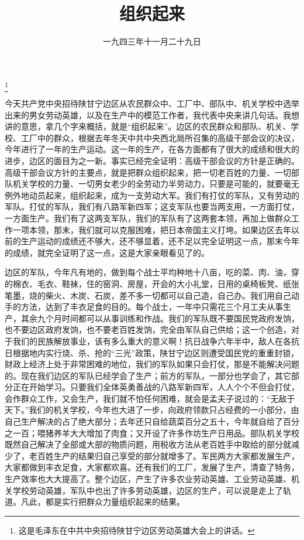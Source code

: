
\title{组织起来}
\date{一九四三年十一月二十九日}
\thanks{这是毛泽东在中共中央招待陕甘宁边区劳动英雄大会上的讲话。}
\maketitle


今天共产党中央招待陕甘宁边区从农民群众中、工厂中、部队中、机关学校中选举出来的男女劳动英雄，以及在生产中的模范工作者，我代表中央来讲几句话。我想讲的意思，拿几个字来概括，就是“组织起来”。边区的农民群众和部队、机关、学校、工厂中的群众，根据去年冬天中共中央西北局所召集的高级干部会议的决议，今年进行了一年的生产运动。这一年的生产，在各方面都有了很大的成绩和很大的进步，边区的面目为之一新。事实已经完全证明：高级干部会议的方针是正确的。高级干部会议方针的主要点，就是把群众组织起来，把一切老百姓的力量、一切部队机关学校的力量、一切男女老少的全劳动力半劳动力，只要是可能的，就要毫无例外地动员起来，组织起来，成为一支劳动大军。我们有打仗的军队，又有劳动的军队。打仗的军队，我们有八路军新四军；这支军队也要当两支用，一方面打仗，一方面生产。我们有了这两支军队，我们的军队有了这两套本领，再加上做群众工作一项本领，那末，我们就可以克服困难，把日本帝国主义打垮。如果边区去年以前的生产运动的成绩还不够大，还不够显着，还不足以完全证明这一点，那末今年的成绩，就完全证明了这一点，这是大家亲眼看见了的。

边区的军队，今年凡有地的，做到每个战士平均种地十八亩，吃的菜、肉、油，穿的棉衣、毛衣、鞋袜，住的窑洞、房屋，开会的大小礼堂，日用的桌椅板凳、纸张笔墨，烧的柴火、木炭、石炭，差不多一切都可以自己造，自己办。我们用自己动手的方法，达到了丰衣足食的目的。每个战士，一年中只需花三个月工夫从事生产，其余九个月时间都可以从事训练和作战。我们的军队既不要国民党政府发饷，也不要边区政府发饷，也不要老百姓发饷，完全由军队自己供给；这一个创造，对于我们的民族解放事业，该有多么重大的意义啊！抗日战争六年半中，敌人在各抗日根据地内实行烧、杀、抢的“三光”政策，陕甘宁边区则遭受国民党的重重封锁，财政上经济上处于非常困难的地位，我们的军队如果只会打仗，那是不能解决问题的。现在我们边区的军队已经学会了生产；前方的军队，一部分也学会了，其它部分正在开始学习。只要我们全体英勇善战的八路军新四军，人人个个不但会打仗，会作群众工作，又会生产，我们就不怕任何困难，就会是孟夫子说过的：“无敌于天下。”我们的机关学校，今年也大进了一步，向政府领款只占经费的一小部分，由自己生产解决的占了绝大部分；去年还只自给蔬菜百分之五十，今年就自给了百分之一百；喂猪养羊大大增加了肉食；又开设了许多作坊生产日用品。部队机关学校既然自己解决了全部或大部的物质问题，用税收方法从老百姓手中取给的部分就减少了，老百姓生产的结果归自己享受的部分就增多了。军民两方大家都发展生产，大家都做到丰衣足食，大家都欢喜。还有我们的工厂，发展了生产，清查了特务，生产效率也大大提高了。整个边区，产生了许多农业劳动英雄、工业劳动英雄、机关学校劳动英雄，军队中也出了许多劳动英雄，边区的生产，可以说是走上了轨道。凡此，都是实行把群众力量组织起来的结果。

